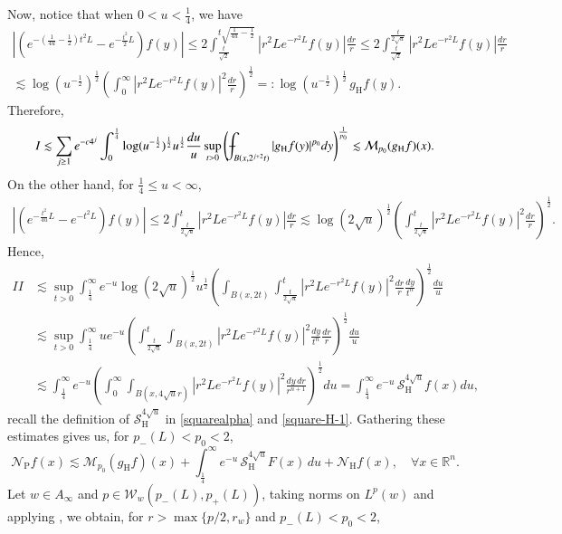 \documentclass[11pt, a4paper,leqno]{amsart}
\def\Xint#1{\mathchoice
    {\XXint\displaystyle\textstyle{#1}}%
    {\XXint\textstyle\scriptstyle{#1}}%
    {\XXint\scriptstyle\scriptscriptstyle{#1}}%
    {\XXint\scriptscriptstyle\scriptscriptstyle{#1}}%
    \!\int}
\def\XXint#1#2#3{{\setbox0=\hbox{$#1{#2#3}{\int}$}
    \vcenter{\hbox{$#2#3$}}\kern-.5\wd0}}
\def\dashint{\Xint-}
\def\Xint#1{\mathchoice
    {\XXint\displaystyle\textstyle{#1}}%
    {\XXint\textstyle\scriptstyle{#1}}%
    {\XXint\scriptstyle\scriptscriptstyle{#1}}%
    {\XXint\scriptscriptstyle\scriptscriptstyle{#1}}%
    \!\int}
\def\XXint#1#2#3{{\setbox0=\hbox{$#1{#2#3}{\int}$}
    \vcenter{\hbox{$#2#3$}}\kern-.5\wd0}}
\theoremstyle{plain}
\theoremstyle{definition}
\theoremstyle{remark}
\numberwithin{equation}{section}
\def \R{ \mathbb{R} }
\def \Scal{ \mathcal{S} }
\def \hh{ \mathrm{H} }
\def \pp{ \mathrm{P} }
\def \Ncal { \mathcal{N} }
\begin{document}
Now, notice that when $0<u<\frac{1}{4}$, we have
\begin{multline*}
\left|\left(e^{-\left(\frac{1}{4u}-\frac{1}{2}\right)t^2L}-e^{-\frac{t^2}{2}L}\right)f(y)\right|\leq 2\int_{\frac{t}{\sqrt{2}}}^{t\sqrt{\frac{1}{4u}-\frac{1}{2}}}|r^2Le^{-r^2L}f(y)|\frac{dr}{r}
\leq 2\int_{\frac{t}{\sqrt{2}}}^{\frac{t}{2\sqrt{u}}}|r^2Le^{-r^2L}f(y)|\frac{dr}{r}
\\
\lesssim \log(u^{-\frac{1}{2}})^{\frac{1}{2}}
\left(\int_{0}^{\infty}|r^2Le^{-r^2L}f(y)|^2\frac{dr}{r}\right)^{\frac{1}{2}}=:\log(u^{-\frac{1}{2}})^{\frac{1}{2}}\, g_{\hh}f(y).
\end{multline*}
Therefore,
$$
I\lesssim  \sum_{j\geq 1}e^{-c4^j}\int_{0}^{\frac{1}{4}}\log(u^{-\frac{1}{2}})^{\frac{1}{2}}u^{\frac{1}{2}}\frac{du}{u}\sup_{t>0}
\left(\dashint_{B(x,2^{j+2}t)}| g_{\hh}f(y)|^{p_0}dy\right)^{\frac{1}{p_0}}\lesssim \mathcal{M}_{p_0}(g_{\hh}f)(x).
$$
On the other hand, for $\frac{1}{4}\leq u<\infty$,
\begin{align*}
\left|\left(e^{-\frac{t^2}{4u}L}-e^{-t^2L}\right)f(y)\right|\leq 2\int_{\frac{t}{2\sqrt{u}}}^{t}|r^2Le^{-r^2L}f(y)|\frac{dr}{r}
\lesssim 
\log(2\sqrt{u})^{\frac{1}{2}}\left(\int_{\frac{t}{2\sqrt{u}}}^{t}|r^2Le^{-r^2L}f(y)|^2\frac{dr}{r}\right)^{\frac{1}{2}}.
\end{align*}
Hence,
\begin{align*}
II&\lesssim
\sup_{t>0} \int_{\frac{1}{4}}^{\infty}e^{-u}\log(2\sqrt{u})^{\frac{1}{2}}u^{\frac{1}{2}}\left(\int_{B(x,2t)}
\int_{\frac{t}{2\sqrt{u}}}^{t}|r^2Le^{-r^2L}f(y)|^2\frac{dr}{r}
\frac{dy}{t^n}\right)^{\frac{1}{2}}\frac{du}{u}
\\&
\lesssim
\sup_{t>0} \int_{\frac{1}{4}}^{\infty}ue^{-u}
\left(\int_{\frac{t}{2\sqrt{u}}}^{t}\int_{B(x,2t)}|r^2Le^{-r^2L}f(y)|^2
\frac{dy}{t^n}\frac{dr}{r}\right)^{\frac{1}{2}}\frac{du}{u}
\\&
\lesssim
 \int_{\frac{1}{4}}^{\infty}e^{-u}\left(\int_{0}^{\infty}\int_{B(x,4\sqrt{u}r)}
|r^2Le^{-r^2L}f(y)|^2\frac{dy\,dr}{r^{n+1}}
\right)^{\frac{1}{2}}du
=
 \int_{\frac{1}{4}}^{\infty}e^{-u}\, \Scal_{\hh}^{4\sqrt{u}}f(x)du,
\end{align*}
recall the definition of $\Scal_{\hh}^{4\sqrt{u}}$ in \eqref{squarealpha} and \eqref{square-H-1}.
Gathering these estimates gives us, for $p_-(L)<p_0<2$, 
$$
\Ncal_{\pp}f(x)\lesssim \mathcal{M}_{p_0}(g_{\hh}f)(x)+\int_{\frac{1}{4}}^{\infty}e^{-u}\, \Scal_{\hh}^{4\sqrt{u}}F(x)\,du+\Ncal_{\hh}f(x), \quad \forall x\in \R^n.
$$
Let $w\in A_{\infty}$ and $p\in \mathcal{W}_w(p_-(L),p_+(L))$, taking norms on $L^p(w)$ and applying \cite[Proposition 3.29]{MartellPrisuelos}, we obtain, for $r>\max\{p/2,r_w\}$ and  $p_-(L)<p_0<2$,
\end{document}
